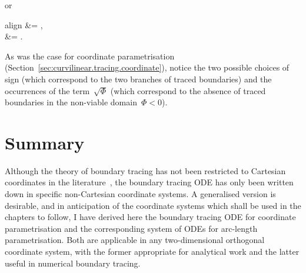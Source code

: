 or
\begin{important}{align}
   &= ,
    \label{eq:tracing-ode-arc-length-parametrisation-u} \\[\tallspace]
   &= .
    \label{eq:tracing-ode-arc-length-parametrisation-v}
\end{important}
As was the case for coordinate parametrisation
(Section~\ref{sec:curvilinear.tracing.coordinate}),
notice the two possible choices of sign
(which correspond to the two branches of traced boundaries)
and the occurrences of the term~$\sqrt{\Phi}$
(which correspond to the absence of traced boundaries
in the non-viable domain~$\Phi < 0$).

\section{Summary}
\label{sec:curvilinear.summary}

Although the theory of boundary tracing
has not been restricted to Cartesian coordinates in the literature~\cite{
  anderson-2002-thesis-boundary-tracing-pdes,
  anderson-2007-boundary-tracing-i-theory,
  anderson-2007-boundary-tracing-ii-applications
},
the boundary tracing ODE has only been written down
in specific non-Cartesian coordinate systems.
A generalised version is desirable,
and in anticipation of the coordinate systems
which shall be used in the chapters to follow,
I have derived here the boundary tracing ODE for coordinate parametrisation
and the corresponding system of ODEs for arc-length parametrisation.
Both are applicable in any two-dimensional orthogonal coordinate system,
with the former appropriate for analytical work
and the latter useful in numerical boundary tracing.
